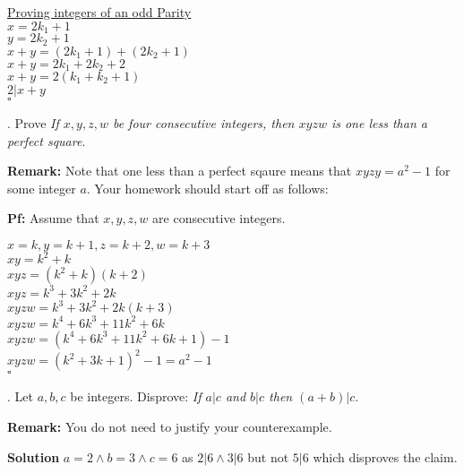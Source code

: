 \documentclass[12pt]{article}
\begin{document}
\underline {Proving integers of an odd Parity} \\ 
\indent $x = 2k_1 + 1$ \\ 
\indent $y = 2k_2 + 1$ \\ 
\indent $x + y = (2k_1 + 1) + (2k_2 + 1)$ \\
\indent $x + y = 2k_1 + 2k_2 + 2$ \\
\indent $x + y = 2(k_1 + k_2 +1)$ \\ 
\indent $2|x+y$ \\
$\square$
\vspace{.15in}


.  Prove \textit{ If $x, y, z, w$ be four consecutive integers, then $xyzw$ is one less than a perfect square}. \\

\vspace{.05in}

\noindent \textbf{Remark:} Note that one less than a perfect sqaure means that $xyzy = a^{2} - 1$ for some integer $a$.  Your homework should start off as follows:
\vspace{.05in}

\noindent \textbf{Pf:}  Assume that $x, y, z, w$ are consecutive integers.   
\vspace{.15in}


\indent $x = k , y = k+1, z = k+2, w = k+3$ \\
\indent $xy = k^2 + k$ \\ 
\indent $xyz = (k^2 + k )(k+2)$ \\ 
\indent $xyz = k^3 + 3k^2 + 2k$ \\ 
\indent $xyzw = k^3 + 3k^2 + 2k (k+3) $ \\ 
\indent $xyzw = k^4 + 6k^3 + 11k^2 + 6k$ \\ 
\indent $xyzw = (k^4 + 6k^3 + 11k^2 + 6k +1) -1 $ \\ 
\indent $xyzw = (k^2 + 3k + 1)^2 -1 = a^2 - 1$ \\
$\square$


.  Let $a, b, c$ be integers.  Disprove:  \textit{ If $a | c$ and $b | c$ then $(a + b) | c$}.
\vspace{.05in}

\noindent \textbf{Remark:} You do not need to justify your counterexample. 
\vspace{.15in}

\textbf{Solution} $ a = 2 \wedge b = 3 \wedge c = 6$ as $2|6 \wedge 3|6$ but not $5|6$ which disproves the claim. \\
\end{document}
